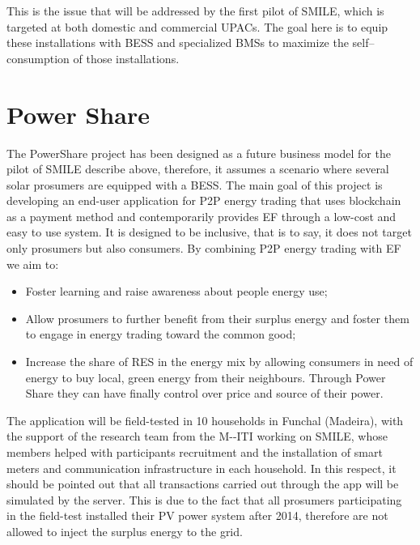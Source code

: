 This is the issue that will be addressed by the first pilot of SMILE, which is targeted at both domestic and commercial \acp{UPAC}. The goal here is to equip these installations with BESS and specialized \acp{BMS} to maximize the self--consumption of those installations.


\section{Power Share}
The PowerShare project has been designed as a future business model for the pilot of SMILE describe above, therefore, it assumes a scenario where several solar prosumers are equipped with a \ac{BESS}.
The main goal of this project is developing an end-user application for P2P energy trading that uses blockchain as a payment method and contemporarily provides \ac{EF} through a low-cost and easy to use system. It is designed to be inclusive, that is to say, it does not target only prosumers but also consumers. By combining P2P energy trading with \ac{EF} we aim to:

\begin{itemize}
\item Foster learning and raise awareness about people energy use;
\item Allow prosumers to further benefit from their surplus energy and foster them to engage in energy trading toward the common good;
\item Increase the share of RES in the energy mix by allowing consumers in need of energy to buy local, green energy from their neighbours. Through Power Share they can have finally control over price and source of their power.
\end{itemize}


The application will be field-tested in 10 households in Funchal (Madeira), with the support of the research team from the \ac{M--ITI} working on SMILE, whose members helped with participants recruitment and the installation of smart meters and communication infrastructure in each household.
In this respect, it should be pointed out that all transactions carried out through the app will be simulated by the server. This is due to the fact that all prosumers participating in the field-test installed their \ac{PV} power system after 2014, therefore are not allowed to inject the surplus energy to the grid.



